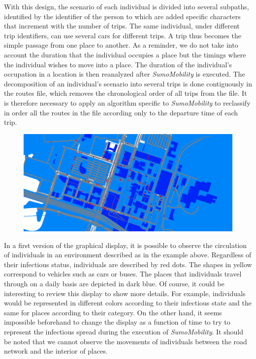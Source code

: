 With this design, the scenario of each individual is divided into several subpaths, identified by the identifier of the person to which are added specific characters that increment with the number of trips. The same individual, under different trip identifiers, can use several cars for different trips. A trip thus becomes the simple passage from one place to another. As a reminder, we do not take into account the duration that the individual occupies a place but the timings where the individual wishes to move into a place. The duration of the individual's occupation in a location is then reanalyzed after \textit{SumoMobility} is executed. The decomposition of an individual's scenario into several trips is done contiguously in the routes file, which removes the chronological order of all trips from the file. It is therefore necessary to apply an algorithm specific to \textit{SumoMobility} to reclassify in order all the routes in the file according only to the departure time of each trip.\\

\begin{figure}[h]
  \centering
  \includegraphics[width=\linewidth]{Media/SumoMobility.png}
  \caption{}
  \label{fig:sumomobility}
\end{figure}

In a first version of the graphical display, it is possible to observe the circulation of individuals in an environment described as in the example above. Regardless of their infectious status, individuals are described by red dots. The shapes in yellow correspond to vehicles such as cars or buses. The places that individuals travel through on a daily basis are depicted in dark blue. Of course, it could be interesting to review this display to show more details. For example, individuals would be represented in different colors according to their infectious state and the same for places according to their category. On the other hand, it seems impossible beforehand to change the display as a function of time to try to represent the infectious spread during the execution of \textit{SumoMobility}. It should be noted that we cannot observe the movements of individuals between the road network and the interior of places.\\

